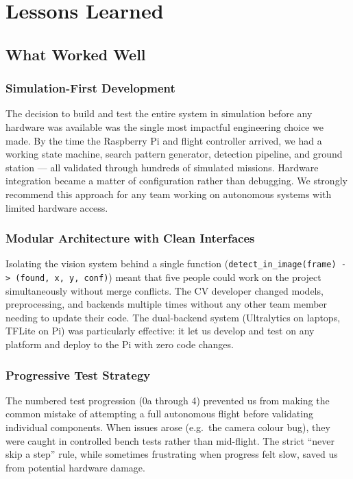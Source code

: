 \section{Lessons Learned}
\label{sec:lessons}

\subsection{What Worked Well}

\subsubsection{Simulation-First Development}

The decision to build and test the entire system in simulation before any hardware was available was the single most impactful engineering choice we made. By the time the Raspberry Pi and flight controller arrived, we had a working state machine, search pattern generator, detection pipeline, and ground station --- all validated through hundreds of simulated missions. Hardware integration became a matter of configuration rather than debugging. We strongly recommend this approach for any team working on autonomous systems with limited hardware access.

\subsubsection{Modular Architecture with Clean Interfaces}

Isolating the vision system behind a single function (\texttt{detect\_in\_image(frame) -> (found, x, y, conf)}) meant that five people could work on the project simultaneously without merge conflicts. The CV developer changed models, preprocessing, and backends multiple times without any other team member needing to update their code. The dual-backend system (Ultralytics on laptops, TFLite on Pi) was particularly effective: it let us develop and test on any platform and deploy to the Pi with zero code changes.

\subsubsection{Progressive Test Strategy}

The numbered test progression (0a through 4) prevented us from making the common mistake of attempting a full autonomous flight before validating individual components. When issues arose (e.g.\ the camera colour bug), they were caught in controlled bench tests rather than mid-flight. The strict ``never skip a step'' rule, while sometimes frustrating when progress felt slow, saved us from potential hardware damage.

